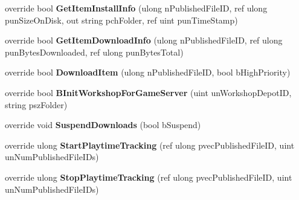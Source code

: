 \begin{DoxyCompactItemize}
\item 
\mbox{\label{class_valve_1_1_steamworks_1_1_c_steam_u_g_c_af8858089c9ce7d1abb2e282b8129b507}} 
override bool {\bfseries Get\+Item\+Install\+Info} (ulong n\+Published\+File\+ID, ref ulong pun\+Size\+On\+Disk, out string pch\+Folder, ref uint pun\+Time\+Stamp)
\item 
\mbox{\label{class_valve_1_1_steamworks_1_1_c_steam_u_g_c_a9aafe9e03b4fa69f3c82f12f1f8c587e}} 
override bool {\bfseries Get\+Item\+Download\+Info} (ulong n\+Published\+File\+ID, ref ulong pun\+Bytes\+Downloaded, ref ulong pun\+Bytes\+Total)
\item 
\mbox{\label{class_valve_1_1_steamworks_1_1_c_steam_u_g_c_a60502585b271c8cf3fb1aa0d1c0fa8d1}} 
override bool {\bfseries Download\+Item} (ulong n\+Published\+File\+ID, bool b\+High\+Priority)
\item 
\mbox{\label{class_valve_1_1_steamworks_1_1_c_steam_u_g_c_abc31eb4f918933bc8293ba456d1e2373}} 
override bool {\bfseries B\+Init\+Workshop\+For\+Game\+Server} (uint un\+Workshop\+Depot\+ID, string psz\+Folder)
\item 
\mbox{\label{class_valve_1_1_steamworks_1_1_c_steam_u_g_c_a7959fbce568ed7217f84676b35ff5136}} 
override void {\bfseries Suspend\+Downloads} (bool b\+Suspend)
\item 
\mbox{\label{class_valve_1_1_steamworks_1_1_c_steam_u_g_c_a129398052cc2225c1cce070d8f012807}} 
override ulong {\bfseries Start\+Playtime\+Tracking} (ref ulong pvec\+Published\+File\+ID, uint un\+Num\+Published\+File\+I\+Ds)
\item 
\mbox{\label{class_valve_1_1_steamworks_1_1_c_steam_u_g_c_a40d355d36f83a3302bb4e1339afb417f}} 
override ulong {\bfseries Stop\+Playtime\+Tracking} (ref ulong pvec\+Published\+File\+ID, uint un\+Num\+Published\+File\+I\+Ds)
\item 
\mbox{\label{class_valve_1_1_steamworks_1_1_c_steam_u_g_c_a7bd2b44fcbc483db0b3a5da4050db74b}} 

\end{DoxyCompactItemize}
